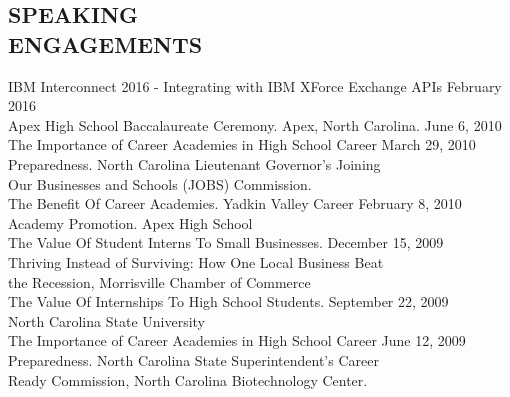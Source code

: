 \documentclass[margin]{res}
\begin{document}
\begin{resume}
\section{SPEAKING \\ ENGAGEMENTS}
    IBM Interconnect 2016 - Integrating with IBM XForce Exchange APIs \hfill February 2016\\
    \newline
	Apex High School Baccalaureate Ceremony. Apex, North Carolina. \hfill June 6, 2010 \\ \newline
	The Importance of Career Academies in High School Career \hfill March 29, 2010\\
	Preparedness. North Carolina Lieutenant Governor's Joining\\
	Our Businesses and Schools (JOBS) Commission.\\ \newline
	The Benefit Of Career Academies. Yadkin Valley Career \hfill February 8, 2010\\
	Academy Promotion. Apex High School \\ \newline
	The Value Of Student Interns To Small Businesses. \hfill December 15, 2009 \\
	Thriving Instead of Surviving: How One Local Business Beat\\
	the Recession, Morrisville Chamber of Commerce \\ \newline
	The Value Of Internships To High School Students. \hfill September 22, 2009 \\ 
	North Carolina State University \\ \newline
	The Importance of Career Academies in High School Career \hfill June 12, 2009 \\
	Preparedness. North Carolina State Superintendent’s Career\\
	Ready Commission, North Carolina Biotechnology Center.


\end{resume}
\end{document}
